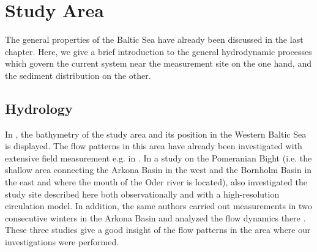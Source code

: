 \section{Study Area}

The general properties of the Baltic Sea have already been discussed in the 
last chapter. Here, we give a brief introduction to the general hydrodynamic 
processes which govern the current system near the measurement site on the one 
hand, and the sediment distribution on the other.

\subsection{Hydrology}

In , the bathymetry of the study area and its position in the 
Western Baltic Sea is displayed. The flow patterns in this area have already 
been investigated with extensive field measurement e.g. in \cite{lass1993}. In 
a study on the Pomeranian Bight (i.e. the shallow area connecting the Arkona 
Basin in the west and the Bornholm Basin in the east and where the mouth of the 
Oder river is located), \cite{lass2001} also investigated the study site 
described here both observationally and with a high-resolution circulation 
model. In addition, the same authors carried out measurements in two consecutive 
winters in the Arkona Basin and analyzed the flow dynamics there 
\citep[][]{lass2003}. These three studies give a good insight 
of the flow patterns in the area where our investigations were performed.
 
